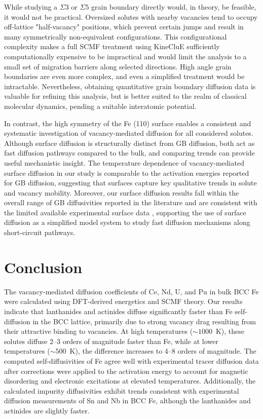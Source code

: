 \documentclass[preprint,12pt]{elsarticle}
\begin{document}
While studying a $\Sigma3$ or $\Sigma5$ grain boundary directly would, in theory, be feasible, it would not be practical. Oversized solutes with nearby vacancies tend to occupy off-lattice "half-vacancy" positions, which prevent certain jumps and result in many symmetrically non-equivalent configurations. This configurational complexity makes a full SCMF treatment using KineCluE sufficiently computationally expensive to be impractical and would limit the analysis to a small set of migration barriers along selected directions. High angle grain boundaries are even more complex, and even a simplified treatment would be intractable.  Nevertheless, obtaining quantitative grain boundary diffusion data is valuable for refining this analysis, but is better suited to the realm of classical molecular dynamics, pending a suitable interatomic potential. 

In contrast, the high symmetry of the Fe (110) surface enables a consistent and systematic investigation of vacancy-mediated diffusion for all considered solutes. Although surface diffusion is structurally distinct from GB diffusion, both act as fast diffusion pathways compared to the bulk, and comparing trends can provide useful mechanistic insight. The temperature dependence of vacancy-mediated surface diffusion in our study is comparable to the activation energies reported for GB diffusion, suggesting that surfaces capture key qualitative trends in solute and vacancy mobility. Moreover, our surface diffusion results fall within the overall range of GB diffusivities reported in the literature and are consistent with the limited available experimental surface data \cite{taylor2024directly}, supporting the use of surface diffusion as a simplified model system to study fast diffusion mechanisms along short-circuit pathways. 


\FloatBarrier

\section{Conclusion}
\noindent The vacancy-mediated diffusion coefficients of Ce, Nd, U, and Pu in bulk BCC Fe were calculated using DFT-derived energetics and SCMF theory. Our results indicate that lanthanides and actinides diffuse significantly faster than Fe self-diffusion in the BCC lattice, primarily due to strong vacancy drag resulting from their attractive binding to vacancies. At high temperatures ($\sim1000$~K), these solutes diffuse 2–3 orders of magnitude faster than Fe, while at lower temperatures ($\sim500$~K), the difference increases to 4–8 orders of magnitude.
The computed self-diffusivities of Fe agree well with experimental tracer diffusion data after corrections were applied to the activation energy to account for magnetic disordering and electronic excitations at elevated temperatures. Additionally, the calculated impurity diffusivities exhibit trends consistent with experimental diffusion measurements of Sn and Nb in BCC Fe, although the lanthanides and actinides are slightly faster.
\end{document}

